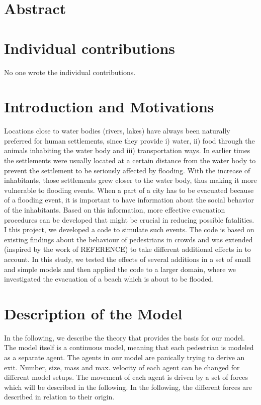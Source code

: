\documentclass[11pt]{article}
\begin{document}
\tableofcontents

\newpage




\section{Abstract}



\section{Individual contributions}
No one wrote the individual contributions.

\section{Introduction and Motivations}
Locations close to water bodies (rivers, lakes) have always been naturally preferred for human settlements, since they provide i) water, ii) food through the animals inhabiting the water body and iii) transportation ways. In earlier times the settlements were usually located at a certain distance from the water body to prevent the settlement to be seriously affected by flooding. With the increase of inhabitants, those settlements grew closer to the water body, thus making it more vulnerable to flooding events.
When a part of a city has to be evacuated because of a flooding event, it is important to have information about the social behavior of the inhabitants. Based on this information, more effective evacuation procedures can be developed that might be crucial in reducing possible fatalities.
I this project, we developed a code to simulate such events. The code is based on existing findings about the behaviour of pedestrians in crowds and was extended (inspired by the work of REFERENCE) to take different additional effects in to account. In this study, we tested the effects of several additions in a set of small and simple models and then applied the code to a larger domain, where we investigated the evacuation of a beach which is about to be flooded. 
\section{Description of the Model}
In the following, we describe the theory that provides the basis for our model. The model itself is a continuous model, meaning that each pedestrian is modeled as a separate agent. The agents in our model are panically trying to derive an exit. Number, size, mass and max. velocity of each agent can be changed for different model setups. The movement of each agent is driven by a set of forces which will be described in the following. In the following, the different forces are described in relation to their origin. 
\end{document}
